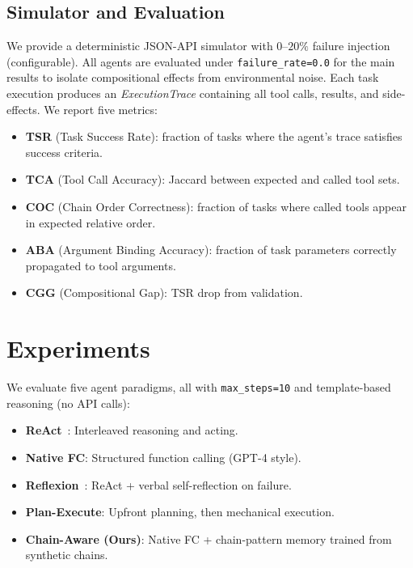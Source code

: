 \documentclass[10pt]{article}
\begin{document}
\subsection{Simulator and Evaluation}

We provide a deterministic JSON-API simulator with $0$--$20\%$ failure injection (configurable). All agents are evaluated under \texttt{failure\_rate=0.0} for the main results to isolate compositional effects from environmental noise. Each task execution produces an \emph{ExecutionTrace} containing all tool calls, results, and side-effects. We report five metrics:

\begin{itemize}
    \item \textbf{TSR} (Task Success Rate): fraction of tasks where the agent's trace satisfies success criteria.
    \item \textbf{TCA} (Tool Call Accuracy): Jaccard between expected and called tool sets.
    \item \textbf{COC} (Chain Order Correctness): fraction of tasks where called tools appear in expected relative order.
    \item \textbf{ABA} (Argument Binding Accuracy): fraction of task parameters correctly propagated to tool arguments.
    \item \textbf{CGG} (Compositional Gap): TSR drop from validation.
\end{itemize}

\section{Experiments}
\label{sec:experiments}

We evaluate five agent paradigms, all with \texttt{max\_steps=10} and template-based reasoning (no API calls):

\begin{itemize}
    \item \textbf{ReAct}~\citep{yao2023react}: Interleaved reasoning and acting.
    \item \textbf{Native FC}: Structured function calling (GPT-4 style).
    \item \textbf{Reflexion}~\citep{shinn2023reflexion}: ReAct + verbal self-reflection on failure.
    \item \textbf{Plan-Execute}: Upfront planning, then mechanical execution.
    \item \textbf{Chain-Aware (Ours)}: Native FC + chain-pattern memory trained from synthetic chains.
\end{itemize}
\end{document}
